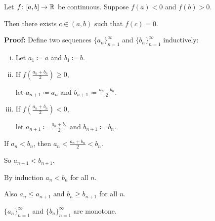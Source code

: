 \documentclass[10pt,aspectratio=169]{beamer}
\begin{document}
\begin{frame}
\begin{lemma}
Let $f \colon [a,b] \to {\mathbb{R}}$ be continuous.
Suppose $f(a) < 0$ and $f(b) > 0$. 

\pause
Then there exists $c \in (a,b)$
such that $f(c) = 0$.
\end{lemma}

\pause
\textbf{Proof:}
Define two sequences $\{ a_n \}_{n=1}^\infty$
and $\{ b_n \}_{n=1}^\infty$ inductively:
\begin{enumerate}[(i)]
\item
\pause
Let $a_1 \coloneqq a$ and $b_1 \coloneqq b$.
\item
\pause
If $f\left(\frac{a_n+b_n}{2}\right) \geq 0$,

let $a_{n+1} \coloneqq a_n$ and
$b_{n+1} \coloneqq \frac{a_n+b_n}{2}$.
\item
\pause
If $f\left(\frac{a_n+b_n}{2}\right) < 0$,

let $a_{n+1} \coloneqq \frac{a_n+b_n}{2}$ and
$b_{n+1} \coloneqq b_n$.
\end{enumerate}

\pause
\vspace*{-1.2in}
\hspace*{2.4in}

\pause
\vspace*{-0.8in}
If $a_n < b_n$, then $a_n < \frac{a_n+b_n}{2} < b_n$.

\pause
So $a_{n+1} < b_{n+1}$.

\pause
By induction $a_n < b_n$ for all $n$.

\pause
\medskip

Also $a_n \leq a_{n+1}$ and $b_n \geq b_{n+1}$ for all $n$.

\pause
$\{a_n\}_{n=1}^\infty$ and $\{ b_n \}_{n=1}^\infty$ are monotone.

\end{frame}
\end{document}
